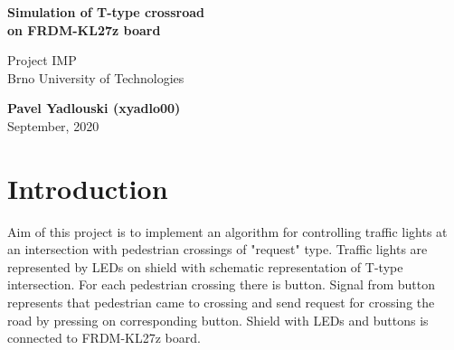 \documentclass[12pt,a4paper]{article}
\begin{document}
    \begin{titlepage}
        \begin{center}
            \vspace*{1cm}
    
            \Large{\textbf{Simulation of T-type crossroad \\ on FRDM-KL27z board}}
    
            \vspace{0.5cm}
            Project IMP\\
            Brno University of Technologies
            \vspace{1.5cm}
            
            
            \vfill
                
            \vspace{0.8cm}
        
            \textbf{Pavel Yadlouski (xyadlo00)}\\
            September, 2020
            
        \end{center}
    \end{titlepage}
    
    \tableofcontents
    \newpage

    \section{Introduction}
    Aim of this project is to implement an algorithm for controlling traffic lights at an intersection with pedestrian crossings of "request" type.
    Traffic lights are represented by LEDs on shield with schematic representation of T-type intersection.
    For each pedestrian crossing there is button.
    Signal from button represents that pedestrian came to crossing and send request for crossing the road by pressing on corresponding button.
    Shield with LEDs and buttons is connected to FRDM-KL27z board.
    
\end{document}
